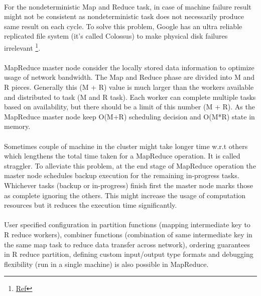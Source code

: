 \documentclass[8pt]{extarticle}
\begin{document}
\paragraph{}
For the nondeterministic Map and Reduce task, in case of machine failure result might not be consistent as nondeterministic task does not necessarily produce same result on each cycle. To solve this problem, Google has an ultra reliable replicated file system (it's called Colossus) to make physical disk failures irrelevant \footnote{\href{https://www.reddit.com/r/compsci/comments/1tdp9c/looking_for_clarification_on_googles_mapreduce/?st=j7dsu0tv&sh=079faa93}{Ref}}.

\paragraph{}
MapReduce master node consider the locally stored data information to optimize usage of network bandwidth. The Map and Reduce phase are divided into M and R pieces. Generally this (M + R)  value is much larger than the workers available and distributed to task (M and R task). Each worker can complete multiple  tasks based on  availability, but there should be a limit of this number (M + R). As the MapReduce master node keep O(M+R) scheduling decision and O(M*R) state in memory.

\paragraph{}
Sometimes couple of machine in the cluster might take longer time w.r.t others which lengthens the total time taken for a MapReduce operation. It is called straggler. To alleviate this problem, at the end stage of MapReduce operation the master node schedules backup execution for the remaining in-progress tasks. Whichever tasks (backup or in-progress) finish first the master node marks those as complete ignoring the others. This might increase the usage of computation resources but it reduces the execution time significantly.

\paragraph{}
User specified configuration in partition functions (mapping intermediate key to R reduce workers), combiner functions (combination of same intermediate key in the same map task to reduce data transfer across network), ordering guarantees in R reduce partition, defining custom input/output type formats and debugging flexibility (run in a single machine) is also possible in MapReduce.
\end{document}
